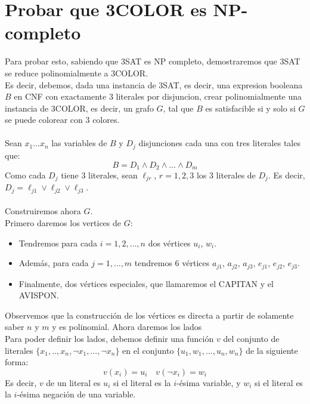 \documentclass[11pt, a4paper]{article}
\theoremstyle{definition}
\begin{document}
\section{Probar que 3COLOR es NP-completo}
Para probar esto, sabiendo que 3SAT es NP completo, demostraremos que 3SAT se reduce polinomialmente a 3COLOR.\\
Es decir, debemos, dada una instancia de 3SAT, es decir, una expresion booleana $B$ en CNF con exactamente 3 literales
por disjuncion, crear polinomialmente una instancia de 3COLOR, es decir, un grafo $G$, tal que $B$ es satisfacible si y solo si $G$
se puede colorear con 3 colores.\\ \\
Sean $x_1 \ldots x_n$ las variables de $B$ y $D_j$ disjunciones cada una con tres literales tales que:
\[
B = D_1 \land D_2 \land \ldots \land D_m
\]
Como cada $D_j$ tiene 3 literales, sean $\ell_{jr}$, $r = 1, 2, 3$ los 3 literales de $D_j$. Es decir, $D_j = \ell_{j1} \vee \ell_{j2} \vee \ell_{j3}$.\\ \\
Construiremos ahora $G$.\\
Primero daremos los vertices de $G$:
\begin{itemize}
    \item Tendremos para cada $i = 1, 2, \ldots, n$ dos vértices $u_i$, $w_i$.
    \item Además, para cada $j = 1, \ldots, m$ tendremos 6 vértices $a_{j1}$, $a_{j2}$, $a_{j3}$, $e_{j1}$, $e_{j2}$, $e_{j3}$.
    \item Finalmente, dos vértices especiales, que llamaremos el CAPITAN y el AVISPON.
\end{itemize}
Observemos que la construcción de los vértices es directa a partir de solamente saber $n$ y $m$ y es polinomial.
\newpage
Ahora daremos los lados\\
Para poder definir los lados, debemos definir una función $v$ del conjunto de literales $\{x_1, .., x_n, \neg x_1, ..., \neg x_n\}$ en el conjunto
$\{u_1, w_1, ..., u_n, w_n\}$ de la siguiente forma:
\[
v(x_i) = u_i \quad v(\neg x_i) = w_i
\]
Es decir, $v$ de un literal es $u_i$ si el literal es la $i$-ésima variable, y $w_i$ si el literal es la $i$-ésima negación de una variable.\\
\end{document}
